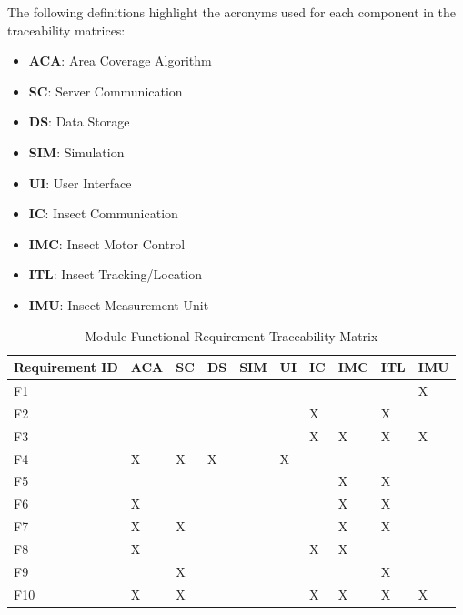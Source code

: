 \documentclass[11pt]{article}
\begin{document}
The following definitions highlight the acronyms used for each component in the traceability matrices:
\begin{itemize}
    \item \textbf{ACA}: Area Coverage Algorithm
    \item \textbf{SC}: Server Communication
    \item \textbf{DS}: Data Storage
    \item \textbf{SIM}: Simulation
    \item \textbf{UI}: User Interface
    \item \textbf{IC}: Insect Communication
    \item \textbf{IMC}: Insect Motor Control
    \item \textbf{ITL}: Insect Tracking/Location
    \item \textbf{IMU}: Insect Measurement Unit
\end{itemize}

\begin{table}[H]
\centering
\caption{Module-Functional Requirement Traceability Matrix}
\label{my-label}
\begin{tabular}{|l|l|l|l|l|l|l|l|l|l|}
\hline
Requirement ID & ACA & SC & DS & SIM & UI & IC & IMC & ITL & IMU \\ \hline
F1             &     &    &    &     &    &    &     &     & X   \\ \hline
F2             &     &    &    &     &    &  X &     &  X  &     \\ \hline
F3             &     &    &    &     &    &  X &  X  &  X  & X   \\ \hline
F4             &  X  &  X & X  &     & X  &    &     &     &     \\ \hline
F5             &     &    &    &     &    &    &  X  &  X  &     \\ \hline
F6             &  X  &    &    &     &    &    &  X  &  X  &     \\ \hline
F7             &  X  & X  &    &     &    &    &  X  &  X  &     \\ \hline
F8             &  X  &    &    &     &    &  X &  X  &     &     \\ \hline
F9             &     & X  &    &     &    &    &     &  X  &     \\ \hline
F10            &  X  & X  &    &     &    &  X &  X  &  X  & X   \\ \hline
\end{tabular}
\end{table}
\end{document}
